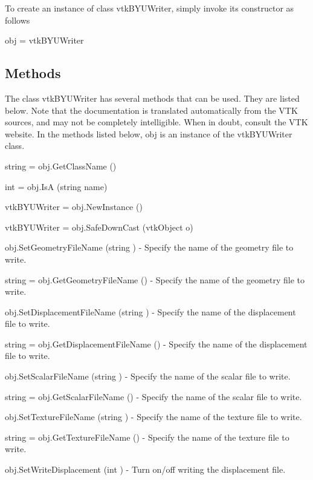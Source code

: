 To create an instance of class vtk\-B\-Y\-U\-Writer, simply invoke its constructor as follows \begin{DoxyVerb}  obj = vtkBYUWriter
\end{DoxyVerb}
 \hypertarget{vtkwidgets_vtkxyplotwidget_Methods}{}\subsection{Methods}\label{vtkwidgets_vtkxyplotwidget_Methods}
The class vtk\-B\-Y\-U\-Writer has several methods that can be used. They are listed below. Note that the documentation is translated automatically from the V\-T\-K sources, and may not be completely intelligible. When in doubt, consult the V\-T\-K website. In the methods listed below, {\ttfamily obj} is an instance of the vtk\-B\-Y\-U\-Writer class. 
\begin{DoxyItemize}
\item {\ttfamily string = obj.\-Get\-Class\-Name ()}  
\item {\ttfamily int = obj.\-Is\-A (string name)}  
\item {\ttfamily vtk\-B\-Y\-U\-Writer = obj.\-New\-Instance ()}  
\item {\ttfamily vtk\-B\-Y\-U\-Writer = obj.\-Safe\-Down\-Cast (vtk\-Object o)}  
\item {\ttfamily obj.\-Set\-Geometry\-File\-Name (string )} -\/ Specify the name of the geometry file to write.  
\item {\ttfamily string = obj.\-Get\-Geometry\-File\-Name ()} -\/ Specify the name of the geometry file to write.  
\item {\ttfamily obj.\-Set\-Displacement\-File\-Name (string )} -\/ Specify the name of the displacement file to write.  
\item {\ttfamily string = obj.\-Get\-Displacement\-File\-Name ()} -\/ Specify the name of the displacement file to write.  
\item {\ttfamily obj.\-Set\-Scalar\-File\-Name (string )} -\/ Specify the name of the scalar file to write.  
\item {\ttfamily string = obj.\-Get\-Scalar\-File\-Name ()} -\/ Specify the name of the scalar file to write.  
\item {\ttfamily obj.\-Set\-Texture\-File\-Name (string )} -\/ Specify the name of the texture file to write.  
\item {\ttfamily string = obj.\-Get\-Texture\-File\-Name ()} -\/ Specify the name of the texture file to write.  
\item {\ttfamily obj.\-Set\-Write\-Displacement (int )} -\/ Turn on/off writing the displacement file.  

\end{DoxyItemize}
